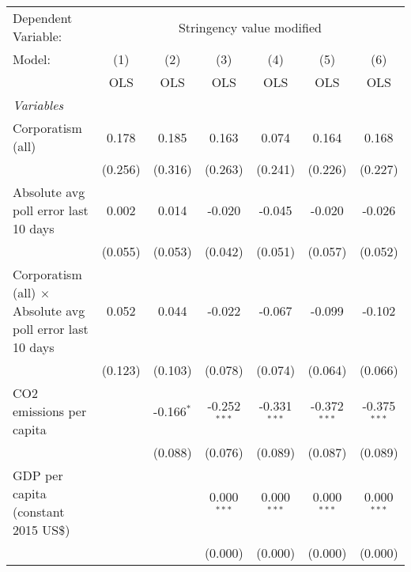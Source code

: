 
\begingroup
\centering
\begin{tabular}{lcccccc}
   \toprule
   Dependent Variable: & \multicolumn{6}{c}{Stringency value modified}\\
   Model:                                                           & (1)     & (2)          & (3)            & (4)            & (5)            & (6)\\  
                                                                    &  OLS    & OLS          & OLS            & OLS            & OLS            & OLS\\  
   \midrule
   \emph{Variables}\\
   Corporatism (all)                                                & 0.178   & 0.185        & 0.163          & 0.074          & 0.164          & 0.168\\   
                                                                    & (0.256) & (0.316)      & (0.263)        & (0.241)        & (0.226)        & (0.227)\\   
   Absolute avg poll error last 10 days                             & 0.002   & 0.014        & -0.020         & -0.045         & -0.020         & -0.026\\   
                                                                    & (0.055) & (0.053)      & (0.042)        & (0.051)        & (0.057)        & (0.052)\\   
   Corporatism (all) $\times$ Absolute avg poll error last 10 days  & 0.052   & 0.044        & -0.022         & -0.067         & -0.099         & -0.102\\   
                                                                    & (0.123) & (0.103)      & (0.078)        & (0.074)        & (0.064)        & (0.066)\\   
   CO2 emissions per capita                                         &         & -0.166$^{*}$ & -0.252$^{***}$ & -0.331$^{***}$ & -0.372$^{***}$ & -0.375$^{***}$\\   
                                                                    &         & (0.088)      & (0.076)        & (0.089)        & (0.087)        & (0.089)\\   
   GDP per capita (constant 2015 US\$)                              &         &              & 0.000$^{***}$  & 0.000$^{***}$  & 0.000$^{***}$  & 0.000$^{***}$\\   
                                                                    &         &              & (0.000)        & (0.000)        & (0.000)        & (0.000)\\   

\end{tabular}
